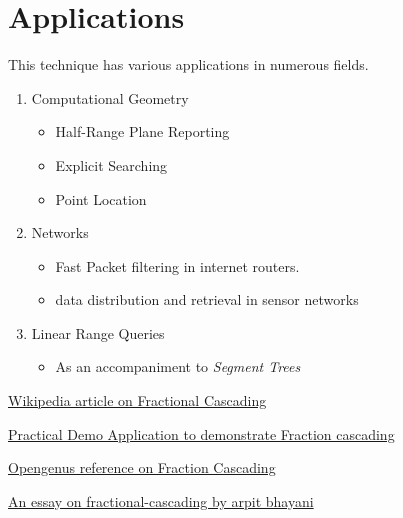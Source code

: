 \documentclass[11pt]{article}
\begin{document}
\section{Applications}
This technique has various applications in numerous fields. \\
\begin{enumerate}
    \item Computational Geometry
    \begin{itemize}
        \item Half-Range Plane Reporting
        \item Explicit Searching 
        \item Point Location
    \end{itemize}
    \item Networks
    \begin{itemize}
        \item Fast Packet filtering in internet routers.
        \item data distribution and retrieval in sensor networks
    \end{itemize}
    \item Linear Range Queries
        \begin{itemize}
            \item As an accompaniment to \textit{Segment Trees}
        \end{itemize}
\end{enumerate}



\pagebreak 
\begin{thebibliography}{}

\href{https://en.wikipedia.org/wiki/Fractional_cascading}{Wikipedia article on Fractional Cascading}

\href{https://ravix339.github.io/FractionalCascading/}{Practical Demo Application to demonstrate Fraction cascading}

\href{https://iq.opengenus.org/fractional-cascading-in-binary-search/amp/}{Opengenus reference on Fraction Cascading}

\href{https://arpitbhayani.me/blogs/fractional-cascading}{An essay on fractional-cascading by arpit bhayani}

\end{thebibliography}
\end{document}
